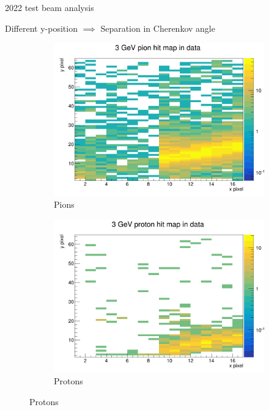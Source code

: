 \documentclass[xcolor={dvipsnames}]{beamer}
\begin{document}
\begin{frame}{2022 test beam analysis}
  \begin{center}
    \Large{Different y-position $\implies$ Separation in Cherenkov angle}
  \end{center}
  \begin{figure}
    \centering
    \begin{subfigure}{0.5\textwidth}
      \includegraphics[width = 1.0\textwidth]{Figs/HitMap_Pos8_Pion_3GeV_Data.png}
      \caption{Pions}
    \end{subfigure}%
    \begin{subfigure}{0.5\textwidth}
      \includegraphics[width = 1.0\textwidth]{Figs/HitMap_Pos8_Proton_3GeV_Data.png}
      \caption{Protons}
    \end{subfigure}%
  \end{figure}
\end{frame}
\end{document}
